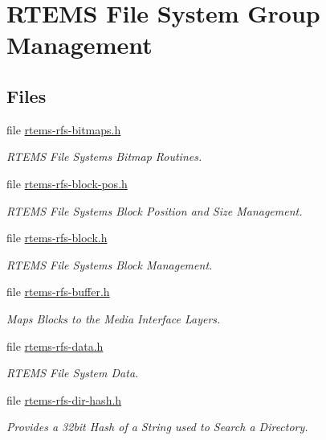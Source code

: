 \hypertarget{group__rtems__rfs}{}\section{R\+T\+E\+MS File System Group Management}
\label{group__rtems__rfs}
\subsection*{Files}
\begin{DoxyCompactItemize}
\item 
file \mbox{\hyperlink{rtems-rfs-bitmaps_8h}{rtems-\/rfs-\/bitmaps.\+h}}
\begin{DoxyCompactList}\small\item\em R\+T\+E\+MS File Systems Bitmap Routines. \end{DoxyCompactList}\item 
file \mbox{\hyperlink{rtems-rfs-block-pos_8h}{rtems-\/rfs-\/block-\/pos.\+h}}
\begin{DoxyCompactList}\small\item\em R\+T\+E\+MS File Systems Block Position and Size Management. \end{DoxyCompactList}\item 
file \mbox{\hyperlink{rtems-rfs-block_8h}{rtems-\/rfs-\/block.\+h}}
\begin{DoxyCompactList}\small\item\em R\+T\+E\+MS File Systems Block Management. \end{DoxyCompactList}\item 
file \mbox{\hyperlink{rtems-rfs-buffer_8h}{rtems-\/rfs-\/buffer.\+h}}
\begin{DoxyCompactList}\small\item\em Maps Blocks to the Media Interface Layers. \end{DoxyCompactList}\item 
file \mbox{\hyperlink{rtems-rfs-data_8h}{rtems-\/rfs-\/data.\+h}}
\begin{DoxyCompactList}\small\item\em R\+T\+E\+MS File System Data. \end{DoxyCompactList}\item 
file \mbox{\hyperlink{rtems-rfs-dir-hash_8h}{rtems-\/rfs-\/dir-\/hash.\+h}}
\begin{DoxyCompactList}\small\item\em Provides a 32bit Hash of a String used to Search a Directory. \end{DoxyCompactList}\item 

\end{DoxyCompactItemize}
